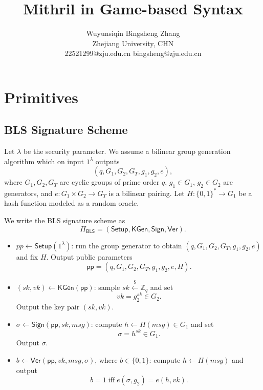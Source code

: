 \documentclass{article}
\title{Mithril in Game-based Syntax}
\author{Wuyunsiqin \quad \quad Bingsheng Zhang \\ 
Zhejiang University, CHN \\
22521299@zju.edu.cn \quad bingsheng@zju.edu.cn}
\begin{document}
\maketitle



\section{Primitives}

\subsection{BLS Signature Scheme}

Let $\lambda$ be the security parameter. We assume a bilinear group
generation algorithm which on input $1^\lambda$ outputs
\[
(q, G_1, G_2, G_T, g_1, g_2, e),
\]
where $G_1,G_2,G_T$ are cyclic groups of prime order $q$, $g_1\in G_1$,
$g_2\in G_2$ are generators, and
$e : G_1 \times G_2 \to G_T$ is a bilinear pairing. Let
$H : \{0,1\}^* \to G_1$ be a hash function modeled as a random oracle.

We write the BLS signature scheme as
\[
  \Pi_{\mathsf{BLS}} = (\mathsf{Setup}, \mathsf{KGen}, \mathsf{Sign}, \mathsf{Ver}).
\]

\begin{itemize}
  \item $pp \leftarrow\mathsf{Setup}(1^\lambda)$:  
        run the group generator to obtain
        $(q, G_1, G_2, G_T, g_1, g_2, e)$ and fix $H$.
        Output public parameters
        \[
          \mathsf{pp} = (q, G_1, G_2, G_T, g_1, g_2, e, H).
        \]

  \item $(sk,vk) \leftarrow\mathsf{KGen}(\mathsf{pp})$:  
        sample $sk \xleftarrow{\$} \mathbb{Z}_q$ and set
        \[
          vk = g_2^{sk} \in G_2.
        \]
        Output the key pair $(sk, vk)$.

  \item $\sigma \leftarrow \mathsf{Sign}(\mathsf{pp}, sk, msg)$:  
        compute $h \leftarrow H(msg) \in G_1$ and set
        \[
          \sigma = h^{sk} \in G_1.
        \]
        Output $\sigma$.

  \item $b \leftarrow \mathsf{Ver}(\mathsf{pp}, vk, msg, \sigma)$, where $b \in \{0,1\}$:  
        compute $h \leftarrow H(msg)$ and output
        \[
          b = 1
          \;\text{iff}\;
          e(\sigma, g_2) = e(h, vk).
        \]
\end{itemize}
\end{document}
